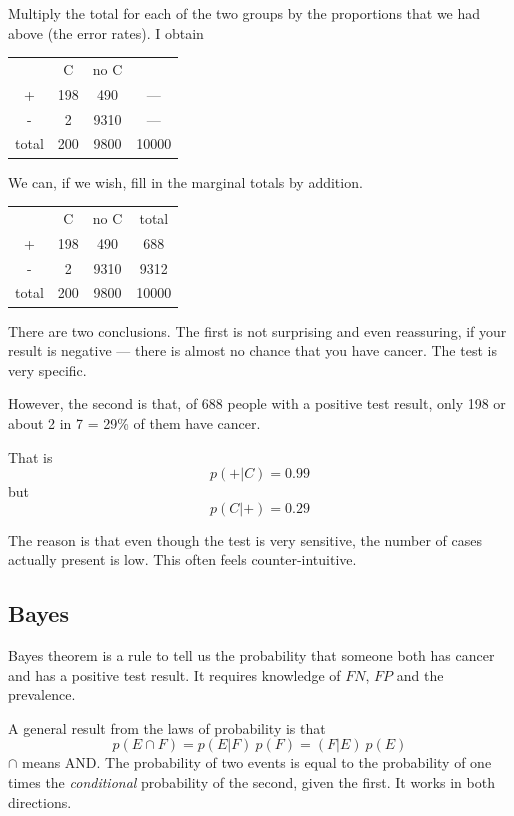 \documentclass[11pt, oneside]{article}
\begin{document}
Multiply the total for each of the two groups by the proportions that we had above (the error rates).  I obtain
\begin{center}
\begin{tabular}{ |c|c|c|c| } 
 \hline
   & C & no C &  \\ 
 + & 198 & 490 & --- \\ 
 - & 2 & 9310 & --- \\ 
 total & 200 & 9800 & 10000 \\ 
 \hline
\end{tabular}
\end{center}

We can, if we wish, fill in the marginal totals by addition.
\begin{center}
\begin{tabular}{ |c|c|c|c| } 
 \hline
   & C & no C &  total \\ 
 + & 198 & 490 & 688 \\ 
 - & 2 & 9310 & 9312 \\ 
 total & 200 & 9800 & 10000 \\ 
 \hline
\end{tabular}
\end{center}

There are two conclusions.  The first is not surprising and even reassuring, if your result is negative --- there is almost no chance that you have cancer.  The test is very specific.

However, the second is that, of 688 people with a positive test result, only 198 or about 2 in 7 = 29\% of them have cancer.

That is
\[ p(+ | C) = 0.99 \]
but
\[ p(C | +) = 0.29 \]

The reason is that even though the test is very sensitive, the number of cases actually present is low.  This often feels counter-intuitive.

\subsection*{Bayes}

Bayes theorem is a rule to tell us the probability that someone both has cancer and has a positive test result.  It requires knowledge of $FN$, $FP$ and the prevalence.

A general result from the laws of probability is that
\[ p(E \cap F) = p(E|F) \ p(F) = (F|E) \ p(E) \]
$\cap$ means AND.  The probability of two events is equal to the probability of one times the \emph{conditional} probability of the second, given the first.  It works in both directions.
\end{document}
